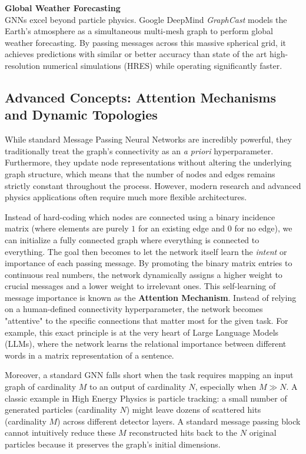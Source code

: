 \textbf{Global Weather Forecasting}\\
GNNs excel beyond particle physics. Google DeepMind \textit{GraphCast} models the Earth's atmosphere as a simultaneous multi-mesh graph to perform global weather forecasting. By passing messages across this massive spherical grid, it achieves predictions with similar or better accuracy than state of the art high-resolution numerical simulations (HRES) while operating significantly faster.

\subsection{Advanced Concepts: Attention Mechanisms and Dynamic Topologies}
While standard Message Passing Neural Networks are incredibly powerful, they traditionally treat the graph's connectivity as an \textit{a priori} hyperparameter. Furthermore, they update node representations without altering the underlying graph structure, which means that the number of nodes and edges remains strictly constant throughout the process. However, modern research and advanced physics applications often require much more flexible architectures.

Instead of hard-coding which nodes are connected using a binary incidence matrix (where elements are purely $1$ for an existing edge and $0$ for no edge), we can initialize a fully connected graph where everything is connected to everything. The goal then becomes to let the network itself learn the \textit{intent} or importance of each passing message. By promoting the binary matrix entries to continuous real numbers, the network dynamically assigns a higher weight to crucial messages and a lower weight to irrelevant ones. This self-learning of message importance is known as the \textbf{Attention Mechanism}. Instead of relying on a human-defined connectivity hyperparameter, the network becomes "attentive" to the specific connections that matter most for the given task. For example, this exact principle is at the very heart of Large Language Models (LLMs), where the network learns the relational importance between different words in a matrix representation of a sentence.

Moreover, a standard GNN falls short when the task requires mapping an input graph of cardinality $M$ to an output of cardinality $N$, especially when $M \gg N$. A classic example in High Energy Physics is particle tracking: a small number of generated particles (cardinality $N$) might leave dozens of scattered hits (cardinality $M$) across different detector layers. A standard message passing block cannot intuitively reduce these $M$ reconstructed hits back to the $N$ original particles because it preserves the graph's initial dimensions.

